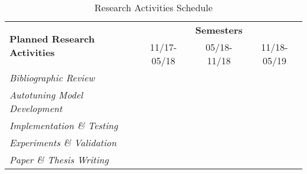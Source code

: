 \begin{table}[htpb]
\centering
    \begin{tabular}{@{}p{}p{}p{}p{}@{}}
        \toprule
        \multirow{2}{*}{\textbf{Planned Research Activities}} & \multicolumn{3}{c}{\textbf{Semesters}} \\
        & \multicolumn{1}{c}{\footnotesize{11/17-05/18}} & \multicolumn{1}{c}{\footnotesize{05/18-11/18}} & \multicolumn{1}{c}{\footnotesize{11/18-05/19}} \\ \midrule
        \textit{Bibliographic Review} & \cellcolor[HTML]{C0C0C0} &  &  \\
        \addlinespace
        \textit{Autotuning Model Development} & \cellcolor[HTML]{C0C0C0} & \cellcolor[HTML]{C0C0C0} &  \\
        \addlinespace
        \textit{Implementation \& Testing} & \cellcolor[HTML]{C0C0C0} & \cellcolor[HTML]{C0C0C0} & \cellcolor[HTML]{C0C0C0} \\
        \addlinespace
        \textit{Experiments \& Validation} &  & \cellcolor[HTML]{C0C0C0} & \cellcolor[HTML]{C0C0C0} \\
        \addlinespace
        \textit{Paper \& Thesis Writing} &  &  & \cellcolor[HTML]{C0C0C0} \\ \bottomrule
    \end{tabular}
    \caption{Research Activities Schedule}
    \label{tab:sched}
\end{table}
